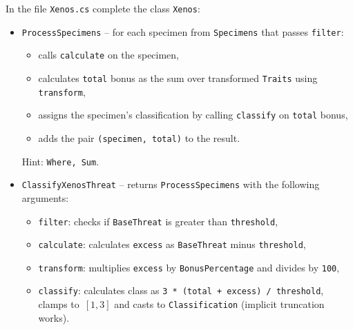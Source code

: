 \documentclass[11pt,a4paper,addpoints]{exam}
\renewcommand*\half{.5}
\begin{document}
\begin{questions}

\question[1\half] In the file \texttt{Xenos.cs} complete the class \texttt{Xenos}:
\begin{itemize}
    \item \texttt{ProcessSpecimens} -- for each specimen from \texttt{Specimens} that passes \texttt{filter}:
    \begin{itemize}
        \item calls \texttt{calculate} on the specimen,
        \item calculates \texttt{total} bonus as the sum over transformed \texttt{Traits} using \texttt{transform},
        \item assigns the specimen's classification by calling \texttt{classify} on \texttt{total} bonus,
        \item adds the pair \texttt{(specimen, total)} to the result.
    \end{itemize}
    Hint: \texttt{Where, Sum}.
    \item \texttt{ClassifyXenosThreat} -- returns \texttt{ProcessSpecimens} with the following arguments:
    \begin{itemize}
        \item \texttt{filter}: checks if \texttt{BaseThreat} is greater than \texttt{threshold},
        \item \texttt{calculate}: calculates \texttt{excess} as \texttt{BaseThreat} minus \texttt{threshold},
        \item \texttt{transform}: multiplies \texttt{excess} by \texttt{BonusPercentage} and divides by \texttt{100},
        \item \texttt{classify}: calculates class as \texttt{3 * (total + excess) / threshold}, \break clamps to~$[1,3]$ and casts to \texttt{Classification} (implicit truncation works).
    \end{itemize}
\end{itemize}


\end{questions}
\end{document}

